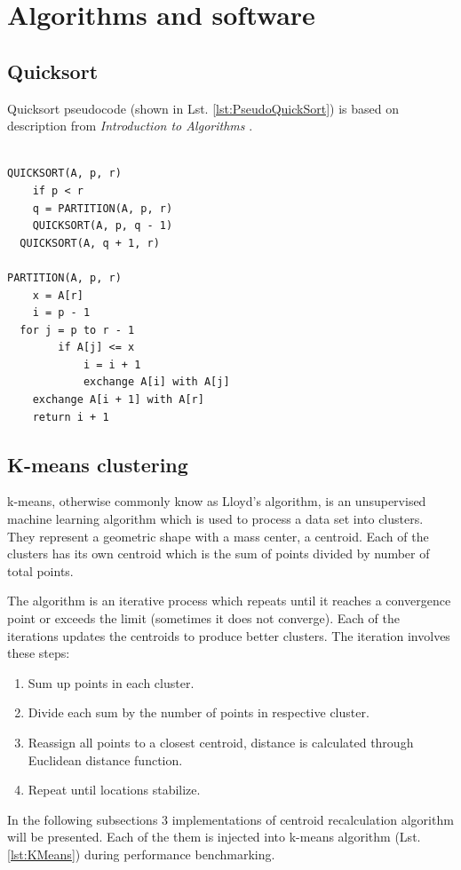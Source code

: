 \chapter{Algorithms and software}
\section{Quicksort}

Quicksort pseudocode (shown in Lst. \ref{lst:PseudoQuickSort}) is based on description from \emph{Introduction to Algorithms} \cite{Cormen2009}.

\begin{lstlisting}[basicstyle=\ttfamily, caption={Sequential Quicksort pseudocode}, label={lst:PseudoQuickSort}]

QUICKSORT(A, p, r)
	if p < r
	q = PARTITION(A, p, r)
	QUICKSORT(A, p, q - 1)
  QUICKSORT(A, q + 1, r)
	
PARTITION(A, p, r)
	x = A[r]
	i = p - 1
  for j = p to r - 1
		if A[j] <= x
			i = i + 1
			exchange A[i] with A[j]
	exchange A[i + 1] with A[r]
	return i + 1
\end{lstlisting}


\clearpage
\section{K-means clustering}
k-means, otherwise commonly know as Lloyd's algorithm, is an unsupervised machine learning algorithm which is used to process a data set into clusters.
They represent a geometric shape with a mass center, a centroid.
Each of the clusters has its own centroid which is the sum of points divided by number of total points. 

The algorithm is an iterative process which repeats until it reaches a convergence point or exceeds the limit (sometimes it does not converge).
Each of the iterations updates the centroids to produce better clusters.
The iteration involves these steps:
\begin{enumerate}
	\item Sum up points in each cluster.
	\item Divide each sum by the number of points in respective cluster.
	\item Reassign all points to a closest centroid, distance is calculated through Euclidean distance function.
	\item Repeat until locations stabilize.
\end{enumerate}

In the following subsections 3 implementations of centroid recalculation algorithm will be presented. Each of the them is injected into k-means algorithm (Lst. \ref{lst:KMeans}) during performance benchmarking.

